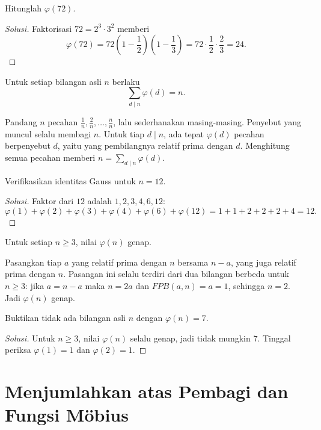 \documentclass[12pt]{scrartcl}
\begin{document}
\begin{example}
Hitunglah $\varphi(72)$.
\end{example}
\begin{proof}[Solusi]
Faktorisasi $72 = 2^3 \cdot 3^2$ memberi
\[ \varphi(72) = 72\left(1 - \frac{1}{2}\right)\left(1 - \frac{1}{3}\right)
= 72 \cdot \frac{1}{2} \cdot \frac{2}{3} = 24. \]
\end{proof}

\begin{theorem}[Gauss]
Untuk setiap bilangan asli $n$ berlaku
\[ \sum_{d \mid n} \varphi(d) = n. \]
\end{theorem}

Pandang $n$ pecahan $\frac{1}{n}, \frac{2}{n}, \dots, \frac{n}{n}$,
lalu sederhanakan masing-masing.
Penyebut yang muncul selalu membagi $n$.
Untuk tiap $d \mid n$, ada tepat $\varphi(d)$ pecahan berpenyebut $d$,
yaitu yang pembilangnya relatif prima dengan $d$.
Menghitung semua pecahan memberi $n = \sum_{d \mid n} \varphi(d)$.

\begin{example}
Verifikasikan identitas Gauss untuk $n = 12$.
\end{example}
\begin{proof}[Solusi]
Faktor dari $12$ adalah $1, 2, 3, 4, 6, 12$:
\[ \varphi(1) + \varphi(2) + \varphi(3) + \varphi(4) + \varphi(6) + \varphi(12)
= 1 + 1 + 2 + 2 + 2 + 4 = 12. \]
\end{proof}

\begin{fact}
Untuk setiap $n \ge 3$, nilai $\varphi(n)$ genap.
\end{fact}

Pasangkan tiap $a$ yang relatif prima dengan $n$ bersama $n - a$,
yang juga relatif prima dengan $n$.
Pasangan ini selalu terdiri dari dua bilangan berbeda untuk $n \ge 3$:
jika $a = n - a$ maka $n = 2a$ dan $FPB(a, n) = a = 1$,
sehingga $n = 2$. Jadi $\varphi(n)$ genap.

\begin{example}
Buktikan tidak ada bilangan asli $n$ dengan $\varphi(n) = 7$.
\end{example}
\begin{proof}[Solusi]
Untuk $n \ge 3$, nilai $\varphi(n)$ selalu genap, jadi tidak mungkin $7$.
Tinggal periksa $\varphi(1) = 1$ dan $\varphi(2) = 1$.
\end{proof}

\section{Menjumlahkan atas Pembagi dan Fungsi M\"obius}
\end{document}
